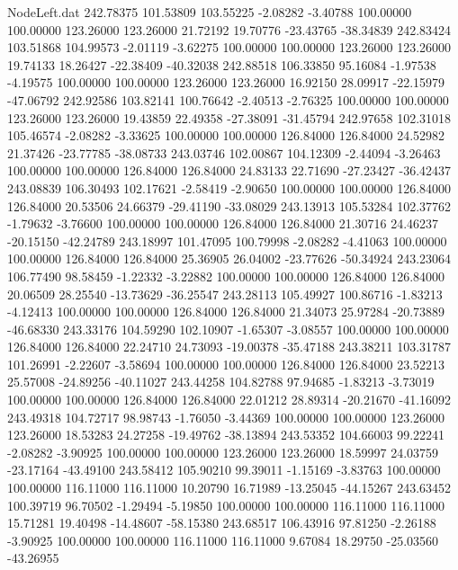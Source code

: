 \begin{filecontents}{NodeLeft.dat}
 242.78375  101.53809  103.55225    -2.08282   -3.40788  100.00000  100.00000  123.26000  123.26000   21.72192   19.70776  -23.43765  -38.34839
 242.83424  103.51868  104.99573    -2.01119   -3.62275  100.00000  100.00000  123.26000  123.26000   19.74133   18.26427  -22.38409  -40.32038
 242.88518  106.33850   95.16084    -1.97538   -4.19575  100.00000  100.00000  123.26000  123.26000   16.92150   28.09917  -22.15979  -47.06792
 242.92586  103.82141  100.76642    -2.40513   -2.76325  100.00000  100.00000  123.26000  123.26000   19.43859   22.49358  -27.38091  -31.45794
 242.97658  102.31018  105.46574    -2.08282   -3.33625  100.00000  100.00000  126.84000  126.84000   24.52982   21.37426  -23.77785  -38.08733
 243.03746  102.00867  104.12309    -2.44094   -3.26463  100.00000  100.00000  126.84000  126.84000   24.83133   22.71690  -27.23427  -36.42437
 243.08839  106.30493  102.17621    -2.58419   -2.90650  100.00000  100.00000  126.84000  126.84000   20.53506   24.66379  -29.41190  -33.08029
 243.13913  105.53284  102.37762    -1.79632   -3.76600  100.00000  100.00000  126.84000  126.84000   21.30716   24.46237  -20.15150  -42.24789
 243.18997  101.47095  100.79998    -2.08282   -4.41063  100.00000  100.00000  126.84000  126.84000   25.36905   26.04002  -23.77626  -50.34924
 243.23064  106.77490   98.58459    -1.22332   -3.22882  100.00000  100.00000  126.84000  126.84000   20.06509   28.25540  -13.73629  -36.25547
 243.28113  105.49927  100.86716    -1.83213   -4.12413  100.00000  100.00000  126.84000  126.84000   21.34073   25.97284  -20.73889  -46.68330
 243.33176  104.59290  102.10907    -1.65307   -3.08557  100.00000  100.00000  126.84000  126.84000   22.24710   24.73093  -19.00378  -35.47188
 243.38211  103.31787  101.26991    -2.22607   -3.58694  100.00000  100.00000  126.84000  126.84000   23.52213   25.57008  -24.89256  -40.11027
 243.44258  104.82788   97.94685    -1.83213   -3.73019  100.00000  100.00000  126.84000  126.84000   22.01212   28.89314  -20.21670  -41.16092
 243.49318  104.72717   98.98743    -1.76050   -3.44369  100.00000  100.00000  123.26000  123.26000   18.53283   24.27258  -19.49762  -38.13894
 243.53352  104.66003   99.22241    -2.08282   -3.90925  100.00000  100.00000  123.26000  123.26000   18.59997   24.03759  -23.17164  -43.49100
 243.58412  105.90210   99.39011    -1.15169   -3.83763  100.00000  100.00000  116.11000  116.11000   10.20790   16.71989  -13.25045  -44.15267
 243.63452  100.39719   96.70502    -1.29494   -5.19850  100.00000  100.00000  116.11000  116.11000   15.71281   19.40498  -14.48607  -58.15380
 243.68517  106.43916   97.81250    -2.26188   -3.90925  100.00000  100.00000  116.11000  116.11000    9.67084   18.29750  -25.03560  -43.26955

\end{filecontents}
